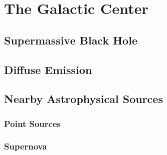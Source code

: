 \cleartooddpage[\thispagestyle{empty}]
\chapter{The Galactic Center}

\section{Supermassive Black Hole}

\section{Diffuse Emission}

\section{Nearby Astrophysical Sources}

\subsection{Point Sources}

\subsection{Supernova}

